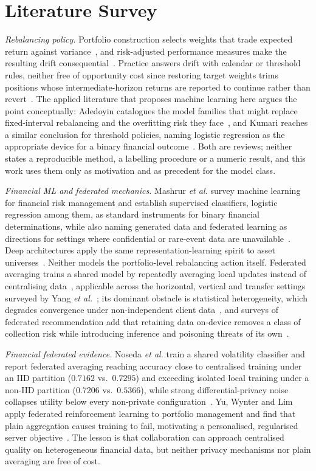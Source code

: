 \section{Literature Survey}\label{sec:literature}

\textit{Rebalancing policy.} Portfolio construction selects weights that trade
expected return against variance~\cite{markowitz1952}, and risk-adjusted
performance measures make the resulting drift consequential~\cite{sharpe1966}.
Practice answers drift with calendar or threshold rules, neither free of
opportunity cost since restoring target weights trims positions whose
intermediate-horizon returns are reported to continue rather than
revert~\cite{jegadeesh1993}. The applied literature that proposes machine
learning here argues the point conceptually: Adedoyin catalogues the model
families that might replace fixed-interval rebalancing and the overfitting
risk they face~\cite{adedoyin_ai}, and Kumari reaches a similar conclusion for
threshold policies, naming logistic regression as the appropriate device for a
binary financial outcome~\cite{kumari2024}. Both are reviews; neither states a
reproducible method, a labelling procedure or a numeric result, and this work
uses them only as motivation and as precedent for the model class.

\textit{Financial ML and federated mechanics.} Mashrur \emph{et al.} survey
machine learning for financial risk management and establish supervised
classifiers, logistic regression among them, as standard instruments for
binary financial determinations, while also naming generated data and
federated learning as directions for settings where confidential or rare-event
data are unavailable~\cite{mashrur2020}. Deep architectures apply the same
representation-learning spirit to asset universes~\cite{heaton2017}. Neither
models the portfolio-level rebalancing action itself. Federated averaging
trains a shared model by repeatedly averaging local updates instead of
centralising data~\cite{mcmahan2017}, applicable across the horizontal,
vertical and transfer settings surveyed by Yang \emph{et al.}~\cite{yang2019federated};
its dominant obstacle is statistical heterogeneity, which degrades convergence
under non-independent client data~\cite{li2020challenges,li2020noniid}, and
surveys of federated recommendation add that retaining data on-device removes
a class of collection risk while introducing inference and poisoning threats
of its own~\cite{javeed2024}.

\textit{Financial federated evidence.} Noseda \emph{et al.} train a shared
volatility classifier and report federated averaging reaching accuracy close
to centralised training under an IID partition ($0.7162$ vs.\ $0.7295$) and
exceeding isolated local training under a non-IID partition ($0.7206$ vs.\
$0.5366$), while strong differential-privacy noise collapses utility below
every non-private configuration~\cite{noseda2025}. Yu, Wynter and Lim apply
federated reinforcement learning to portfolio management and find that plain
aggregation causes training to fail, motivating a personalised, regularised
server objective~\cite{yu2022fedrl}. The lesson is that collaboration can
approach centralised quality on heterogeneous financial data, but neither
privacy mechanisms nor plain averaging are free of cost.

